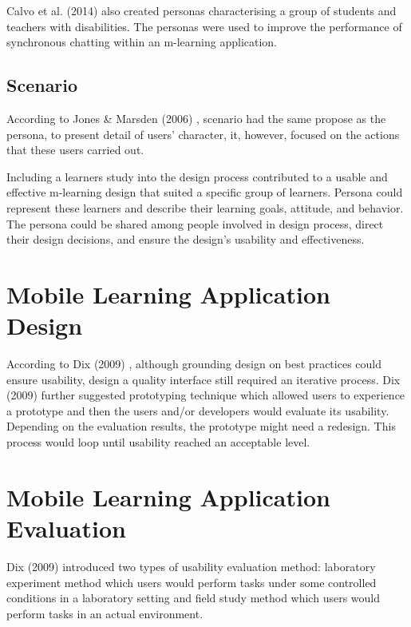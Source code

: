Calvo et al. (2014) \cite{calvo2014user} also created personas characterising a group of students and teachers with disabilities. The personas were used to improve the performance of synchronous chatting within an m-learning application. 


\subsection{Scenario} 

According to Jones \& Marsden (2006) \cite{jones2006mobile}, scenario had the same propose as the persona, to present detail of users' character, it, however, focused on the actions that these users carried out. 

Including a learners study into the design process contributed to a usable and effective m-learning design that suited a specific group of learners. Persona could represent these learners and describe their learning goals, attitude, and behavior. The persona could be shared among people involved in design process, direct their design decisions, and ensure the design's usability and effectiveness. 


\newpage 
\section{Mobile Learning Application Design}

According to Dix (2009) \cite{dix2009human}, although grounding design on best practices could ensure usability, design a quality interface still required an iterative process. Dix (2009) \cite{dix2009human} further suggested prototyping technique which allowed users to experience a prototype and then the users and/or developers would evaluate its usability. Depending on the evaluation results, the prototype might need a redesign. This process would loop until usability reached an acceptable level. 


\section{Mobile Learning Application Evaluation}

Dix (2009) \cite{dix2009human} introduced two types of usability evaluation method: laboratory experiment method which users would perform tasks under some controlled conditions in a laboratory setting and field study method which users would perform tasks in an actual environment. 













